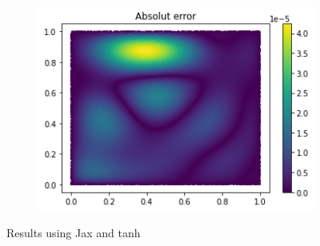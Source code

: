 \begin{figure}[H]
\begin{subfigure}{.45\textwidth}
    \label{fig:sub3}
    \end{subfigure}
\begin{subfigure}{.45\textwidth}
    \centering
    \includegraphics[width=.8\linewidth]{images/NN_Jax_PDE8_files_tanh/NN_Jax_PDE8_24_0.png}
    \label{fig:sub4}
\end{subfigure}
\caption{Results using Jax and tanh}
\label{fig:test}
\end{figure}

\newpage
